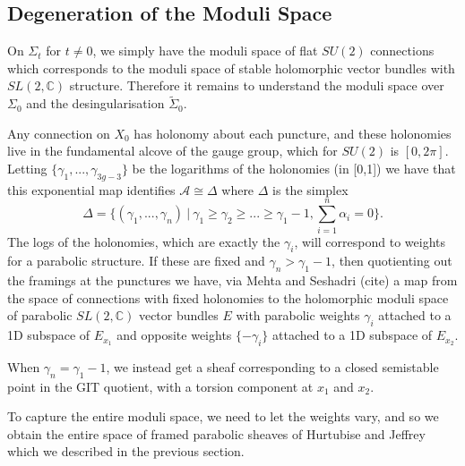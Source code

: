 \documentclass[]{article}
\newcommand{\C}{\mathbb{C}}
\newcommand{\cA}{\mathcal{A}}
\begin{document}
\subsection{Degeneration of the Moduli Space}
	On $\Sigma_t$ for $t\neq 0$, we simply have the moduli space of flat $SU(2)$ connections which corresponds to the moduli space of stable holomorphic vector bundles with $SL(2,\C)$ structure. Therefore it remains to understand the moduli space over $\Sigma_0$ and the desingularisation $\tilde{\Sigma}_0$. 
	
	Any connection on $X_0$ has holonomy about each puncture, and these holonomies live in the fundamental alcove of the gauge group, which for $SU(2)$ is $[0,2\pi]$. Letting $\{\gamma_1,...,\gamma_{3g-3}\}$ be the logarithms of the holonomies (in [0,1])
	we have that this exponential map identifies $\cA \cong \Delta$ where $\Delta$ is the simplex 
	\begin{equation}
		\Delta = \{(\gamma_1,...,\gamma_n) ~|~ \gamma_1 \geq \gamma_2 \geq ... \geq \gamma_1 - 1, \sum_{i=1}^n \alpha_i =0\}.
	\end{equation}
	The logs of the holonomies, which are exactly the $\gamma_i$, will correspond to weights for a parabolic structure. If these are fixed and $\gamma_n > \gamma_1 -1$, then quotienting out the framings at the punctures we have, via Mehta and Seshadri (cite) a map from the space of connections with fixed holonomies to the holomorphic moduli space of parabolic $SL(2,\C)$ vector bundles $E$ with parabolic weights ${\gamma_i}$ attached to a 1D subspace of $E_{x_1}$ and opposite weights $\{-\gamma_i\}$ attached to a 1D subspace of $E_{x_2}$.
	
	When $\gamma_n = \gamma_1-1$, we instead get a sheaf corresponding to a closed semistable point in the GIT quotient, with a torsion component at $x_1$ and $x_2$. 
	
	To capture the entire moduli space, we need to let the weights vary, and so we obtain the entire space of framed parabolic sheaves of Hurtubise and Jeffrey which we described in the previous section. 
\end{document}
